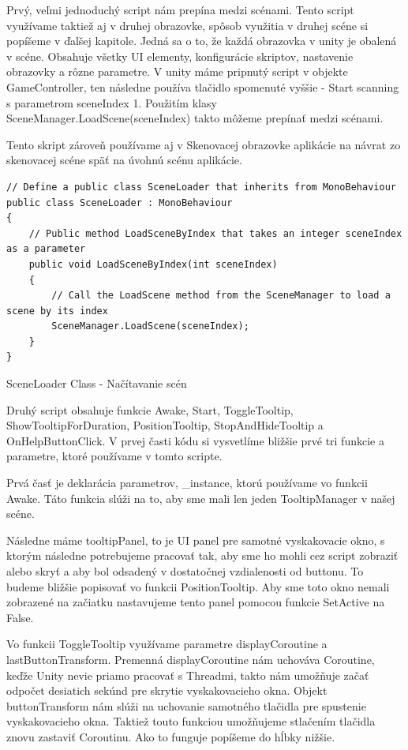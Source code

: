 Prvý, veľmi jednoduchý script nám prepína medzi scénami. Tento script využívame taktiež aj v druhej obrazovke, spôsob využitia v druhej scéne si popíšeme v ďalšej kapitole. Jedná sa o to, že každá obrazovka v unity je obalená v scéne. Obsahuje všetky UI elementy, konfigurácie skriptov, nastavenie obrazovky a rôzne parametre. V unity máme pripnutý script v objekte GameController, ten následne používa tlačidlo spomenuté vyššie - Start scanning s parametrom sceneIndex 1. Použitím klasy SceneManager.LoadScene(sceneIndex) takto môžeme prepínať medzi scénami.

Tento skript zároveň používame aj v Skenovacej obrazovke aplikácie na návrat zo skenovacej scéne späť na úvohnú scénu aplikácie.

\begin{algorithm}[H]
 \lstset{style=Csharp}
    \begin{lstlisting}
// Define a public class SceneLoader that inherits from MonoBehaviour
public class SceneLoader : MonoBehaviour
{
    // Public method LoadSceneByIndex that takes an integer sceneIndex as a parameter
    public void LoadSceneByIndex(int sceneIndex)
    {
        // Call the LoadScene method from the SceneManager to load a scene by its index
        SceneManager.LoadScene(sceneIndex);
    }
}
    \end{lstlisting}
     \caption{SceneLoader Class - Načítavanie scén}
     \label{sceneLoader}
\end{algorithm}

Druhý script obsahuje funkcie Awake, Start, ToggleTooltip, ShowTooltipForDuration, PositionTooltip, StopAndHideTooltip a OnHelpButtonClick. V prvej časti kódu si vysvetlíme bližšie prvé tri funkcie a parametre, ktoré používame v tomto scripte. 

Prvá časť je deklarácia parametrov, \_instance, ktorú používame vo funkcii Awake. Táto funkcia slúži na to, aby sme mali len jeden TooltipManager v našej scéne. 

Následne máme tooltipPanel, to je UI panel pre samotné vyskakovacie okno, s ktorým následne potrebujeme pracovať tak, aby sme ho mohli cez script zobraziť alebo skryť a aby bol odsadený v dostatočnej vzdialenosti od buttonu. To budeme bližšie popisovať vo funkcii PositionTooltip. Aby sme toto okno nemali zobrazené na začiatku nastavujeme tento panel pomocou funkcie SetActive na False.

Vo funkcii ToggleTooltip využívame parametre displayCoroutine a lastButtonTransform. Premenná displayCoroutine nám uchováva Coroutine, keďže Unity nevie priamo pracovať s Threadmi, takto nám umožňuje začať odpočet desiatich sekúnd pre skrytie vyskakovacieho okna. Objekt buttonTransform nám slúži na uchovanie samotného tlačidla pre spustenie vyskakovacieho okna. Taktiež touto funkciou umožňujeme stlačením tlačidla znovu zastaviť Coroutinu. Ako to funguje popíšeme do hĺbky nižšie.

